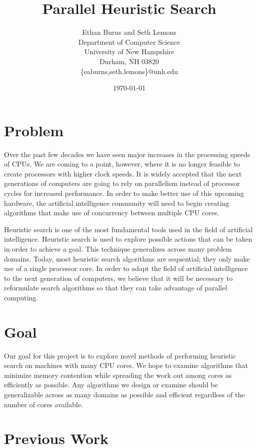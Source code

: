 \documentclass{article}
\title{\textbf{Parallel Heuristic Search}}
\author{Ethan Burns and Seth Lemons \\
  Department of Computer Science \\
  University of New Hampshire \\
  Durham, NH 03820 \\
  \{eaburns,seth.lemons\}@unh.edu}
\date{\today}
\begin{document}
\maketitle

\section{Problem}

Over the past few decades we have seen major increases in the
processing speeds of CPUs.  We are coming to a point, however, where
it is no longer feasible to create processors with higher clock
speeds.  It is widely accepted that the next generations of computers
are going to rely on parallelism instead of processor cycles for
increased performance.  In order to make better use of this upcoming
hardware, the artificial intelligence community will need to begin
creating algorithms that make use of concurrency between multiple CPU
cores.

Heuristic search is one of the most fundamental tools used in the
field of artificial intelligence.  Heuristic search is used to explore
possible actions that can be taken in order to achieve a goal.  This
technique generalizes across many problem domains.  Today, most
heuristic search algorithms are sequential; they only make use of a
single processor core.  In order to adapt the field of artificial
intelligence to the next generation of computers, we believe that it
will be necessary to reformulate search algorithms so that they can
take advantage of parallel computing.

\section{Goal}

Our goal for this project is to explore novel methods of performing
heuristic search on machines with many CPU cores. We hope to examine
algorithms that minimize memory contention while spreading the work
out among cores as efficiently as possible. Any algorithms we design
or examine should be generalizable across as many domains as possible
and efficient regardless of the number of cores available.

\section{Previous Work}
\end{document}
